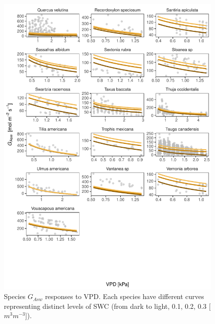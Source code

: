\documentclass[11pt,twoside]{reedthesis}
\begin{document}
\begin{figure}[H]

{\centering \includegraphics[width=1\linewidth]{figure/appendixD/ggg7} 

}

\caption{Species $G_{Asw}$ responses to VPD. Each species have different curves representing distinct levels of SWC (from dark to light, 0.1, 0.2, 0.3 [$m^3 m^{-3}$]).}\label{fig:unnamed-chunk-24}
\end{figure}
\end{document}
